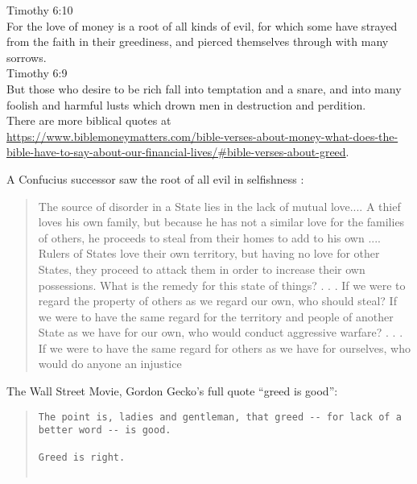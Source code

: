 \documentclass[10pt, letterpaper]{article}
\begin{document}
\begin{spacing}{1.8}
Timothy 6:10\\
For the love of money is a root of all kinds of evil, for which some have strayed from the faith in their greediness, and pierced themselves through with many sorrows.\\

Timothy 6:9\\
But those who desire to be rich fall into temptation and a snare, and into many foolish and harmful lusts which drown men in destruction and perdition.\\


There are more biblical quotes at\\ \url{https://www.biblemoneymatters.com/bible-verses-about-money-what-does-the-bible-have-to-say-about-our-financial-lives/#bible-verses-about-greed}.

{A Confucius successor saw the root of all evil in selfishness \citep[][p. 332]{hirst34}:
 \begin{quote}
 The source of disorder in a State lies in the lack of mutual
 love.... A thief loves his own family, but because he has not a
 similar love for the families of others, he proceeds to steal from
 their homes to add to his own .... Rulers of States love their own
 territory, but having no love for other States, they proceed to
 attack them in order to increase their own possessions. What is
 the remedy for this state of things? . . . If we were to regard the
 property of others as we regard our own, who should steal?
 If we were to have the same regard for the territory and people of
 another State as we have for our own, who would conduct
 aggressive warfare? . . . If we were to have the same regard for
 others as we have for ourselves, who would do anyone an injustice   
 \end{quote}
}

The Wall Street Movie, Gordon Gecko's full quote ``greed is good'':
\begin{quote}
\begin{verbatim}                                                                          
The point is, ladies and gentleman, that greed -- for lack of a better word -- is good.   
                                                                                          
Greed is right.                                                                           
                                                                                          

\end{verbatim}
\end{quote}
\end{spacing}
\end{document}
